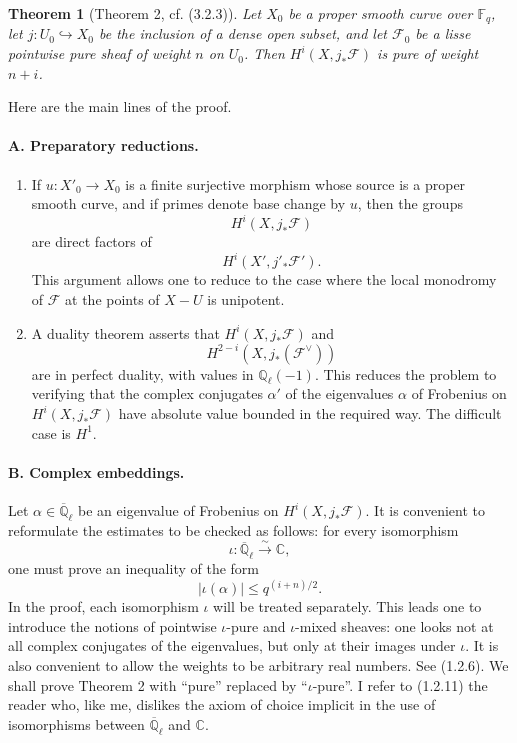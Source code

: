 \documentclass[11pt]{article}
\newtheorem{theorem}{Theorem}
\theoremstyle{remark}
\newcommand{\Ql}{\mathbb{Q}_\ell}
\newcommand{\CC}{\mathbb{C}}
\newcommand{\Fq}{\mathbb{F}_q}
\newcommand{\Abar}{\overline{\mathbb{Q}}_\ell}
\begin{document}
\begin{theorem}[Theorem 2, cf. (3.2.3)]
Let $X_0$ be a proper smooth curve over $\Fq$, let $j:U_0\hookrightarrow X_0$ be the inclusion of a dense open subset, and let $\mathcal F_0$ be a lisse pointwise pure sheaf of weight $n$ on $U_0$. Then $H^i(X,j_*\mathcal F)$ is pure of weight $n+i$.
\end{theorem}

Here are the main lines of the proof.

\paragraph{A. Preparatory reductions.}
\begin{enumerate}[label=(\roman*)]
\item If $u:X'_0\to X_0$ is a finite surjective morphism whose source is a proper smooth curve, and if primes denote base change by $u$, then the groups
\[
H^i(X,j_*\mathcal F)
\]
are direct factors of
\[
H^i(X',j'_*\mathcal F').
\]
This argument allows one to reduce to the case where the local monodromy of $\mathcal F$ at the points of $X-U$ is unipotent.
\item A duality theorem asserts that $H^i(X,j_*\mathcal F)$ and
\[
H^{2-i}(X,j_*(\mathcal F^\vee))
\]
are in perfect duality, with values in $\Ql(-1)$. This reduces the problem to verifying that the complex conjugates $\alpha'$ of the eigenvalues $\alpha$ of Frobenius on $H^i(X,j_*\mathcal F)$ have absolute value bounded in the required way. The difficult case is $H^1$.
\end{enumerate}

\paragraph{B. Complex embeddings.}
Let $\alpha\in \Abar$ be an eigenvalue of Frobenius on $H^i(X,j_*\mathcal F)$. It is convenient to reformulate the estimates to be checked as follows: for every isomorphism
\[
\iota:\Abar\xrightarrow{\sim}\CC,
\]
one must prove an inequality of the form
\[
|\iota(\alpha)|\le q^{(i+n)/2}.
\]
In the proof, each isomorphism $\iota$ will be treated separately. This leads one to introduce the notions of pointwise $\iota$-pure and $\iota$-mixed sheaves: one looks not at all complex conjugates of the eigenvalues, but only at their images under $\iota$. It is also convenient to allow the weights to be arbitrary real numbers. See (1.2.6). We shall prove Theorem 2 with ``pure'' replaced by ``$\iota$-pure''. I refer to (1.2.11) the reader who, like me, dislikes the axiom of choice implicit in the use of isomorphisms between $\Abar$ and $\CC$.
\end{document}
